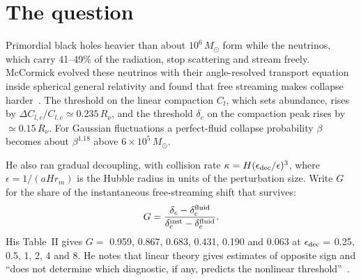 \documentclass[11pt]{article}
\begin{document}
\begin{abstract}
$r=1/16$ to $16$ show that the surviving share is not set by the connection energy, which is stationary at $r=1$, but by the direction of the flux--shear mismatch, its reflection coefficient $\Gamma_{12}=(\kappa_2-\kappa_1)/(\kappa_2+\kappa_1)$: $G$ runs from $0.776$ to $0.129$, and its offset $\ln[(1-G)/G]$ moves close to a straight line in the link rapidity $\tfrac12\ln r$, at a rate of $1.113\pm0.007$ near the matched link. Damping the shear alone, with every higher moment left at the flux rate, gives a larger rate, $1.204$, where any rule built from link-weight ratios predicts less than $0.1$: the threshold reads the shear itself. The frozen memory form misses this effect entirely. Halving the neutrino fraction to $R_\nu=0.2$ leaves $G$ at $0.409$, against $0.425$ at $R_\nu=0.409$ measured with the same code. The algebraic identities, the counterexample and the verdict arithmetic are machine-checked in Lean (Appendix~C). Two further tests are stated for the e$^\pm$ annihilation epoch and for the mean of the rates.
\end{abstract}

\section{The question}

Primordial black holes heavier than about $10^6\,M_\odot$ form while the neutrinos, which carry 41--49\% of the radiation, stop scattering and stream freely. McCormick evolved these neutrinos with their angle-resolved transport equation inside spherical general relativity and found that free streaming makes collapse harder~\cite{McC}. The threshold on the linear compaction $C_l$, which sets abundance, rises by $\Delta C_{l,c}/C_{l,c}\simeq0.235\,R_\nu$, and the threshold $\delta_c$ on the compaction peak rises by $\simeq0.15\,R_\nu$. For Gaussian fluctuations a perfect-fluid collapse probability $\beta$ becomes about $\beta^{1.18}$ above $6\times10^5\,M_\odot$.

He also ran gradual decoupling, with collision rate $\kappa=H(\epsilon_{\rm dec}/\epsilon)^3$, where $\epsilon=1/(aHr_m)$ is the Hubble radius in units of the perturbation size. Write $G$ for the share of the instantaneous free-streaming shift that survives:
\begin{equation}
G=\frac{\delta_c-\delta_c^{\rm fluid}}{\delta_c^{\rm inst}-\delta_c^{\rm fluid}}.
\end{equation}
His Table~II gives $G=$ 0.959, 0.867, 0.683, 0.431, 0.190 and 0.063 at $\epsilon_{\rm dec}=$ 0.25, 0.5, 1, 2, 4 and 8. He notes that linear theory gives estimates of opposite sign and ``does not determine which diagnostic, if any, predicts the nonlinear threshold''~\cite[Sec.~IV\,C]{McC}.
\end{document}
